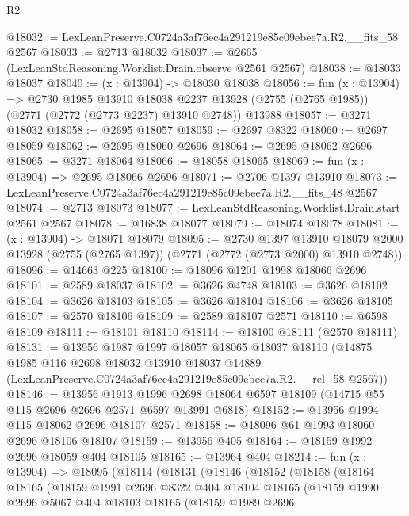 \begin{lexlean}{R2}
\begin{coremodule}
@18032 := LexLeanPreserve.C0724a3af76ec4a291219e85c09ebee7a.R2.__fits_58 @2567
@18033 := @2713 @18032
@18037 := @2665 (LexLeanStdReasoning.Worklist.Drain.observe @2561 @2567)
@18038 := @18033 @18037
@18040 := (x : @13904) -> @18030 @18038
@18056 := fun (x : @13904) =>
  @2730
    @1985
    @13910
    @18038
    @2237
    @13928
    (@2755 (@2765 @1985))
    (@2771 (@2772 (@2773 @2237) @13910 @2748))
    @13988
@18057 := @3271 @18032
@18058 := @2695 @18057
@18059 := @2697 @8322
@18060 := @2697 @18059
@18062 := @2695 @18060 @2696
@18064 := @2695 @18062 @2696
@18065 := @3271 @18064
@18066 := @18058 @18065
@18069 := fun (x : @13904) => @2695 @18066 @2696
@18071 := @2706 @1397 @13910
@18073 := LexLeanPreserve.C0724a3af76ec4a291219e85c09ebee7a.R2.__fits_48 @2567
@18074 := @2713 @18073
@18077 := LexLeanStdReasoning.Worklist.Drain.start @2561 @2567
@18078 := @16838 @18077
@18079 := @18074 @18078
@18081 := (x : @13904) -> @18071 @18079
@18095 := @2730
    @1397
    @13910
    @18079
    @2000
    @13928
    (@2755 (@2765 @1397))
    (@2771 (@2772 (@2773 @2000) @13910 @2748))
@18096 := @14663 @225
@18100 := @18096 @1201 @1998 @18066 @2696
@18101 := @2589 @18037
@18102 := @3626 @4748
@18103 := @3626 @18102
@18104 := @3626 @18103
@18105 := @3626 @18104
@18106 := @3626 @18105
@18107 := @2570 @18106
@18109 := @2589 @18107 @2571
@18110 := @6598 @18109
@18111 := @18101 @18110
@18114 := @18100 @18111 (@2570 @18111)
@18131 := @13956
    @1987
    @1997
    @18057
    @18065
    @18037
    @18110
    (@14875
      @1985
      @116
      @2698
      @18032
      @13910
      @18037
      @14889
      (LexLeanPreserve.C0724a3af76ec4a291219e85c09ebee7a.R2.__rel_58 @2567))
@18146 := @13956
    @1913
    @1996
    @2698
    @18064
    @6597
    @18109
    (@14715 @55 @115 @2696 @2696 @2571 @6597 @13991 @6818)
@18152 := @13956 @1994 @115 @18062 @2696 @18107 @2571
@18158 := @18096 @61 @1993 @18060 @2696 @18106 @18107
@18159 := @13956 @405
@18164 := @18159 @1992 @2696 @18059 @404 @18105
@18165 := @13964 @404
@18214 := fun (x : @13904) =>
  @18095
    (@18114
      (@18131
        (@18146
          (@18152
            (@18158
              (@18164
                @18165
                (@18159
                  @1991
                  @2696
                  @8322
                  @404
                  @18104
                  @18165
                  (@18159
                    @1990
                    @2696
                    @5067
                    @404
                    @18103
                    @18165
                    (@18159
                      @1989
                      @2696

\end{coremodule}
\end{lexlean}
